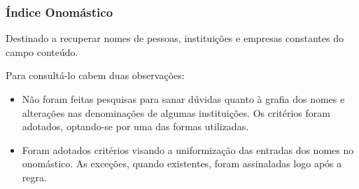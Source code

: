 \subsubsection{Índice Onomástico}

Destinado a recuperar nomes de pessoas, instituições e empresas constantes do campo conteúdo.

Para consultá-lo cabem duas observações:

\begin{itemize}
	\item Não foram feitas pesquisas para sanar dúvidas quanto à grafia dos nomes e alterações nas denominações de algumas instituições. Os critérios foram adotados, optando-se por uma das formas utilizadas.
	\item Foram adotados critérios visando a uniformização das entradas dos nomes no onomástico. As exceções, quando existentes, foram assinaladas logo após a regra.
\end{itemize}

